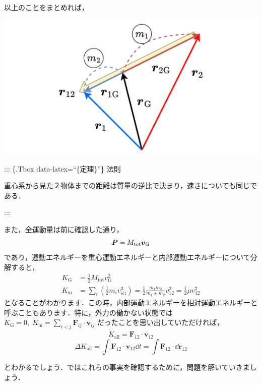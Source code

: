 \documentclass[
  b4paperpaper,
  xelatex,ja=standard]{bxjsbook}
\begin{document}
以上のことをまとめれば，

\includegraphics{source/images/energy/energy2.png}

::: \{.Tbox data-latex=``\{定理\}''\} 法則

重心系から見た２物体までの距離は質量の逆比で決まり，速さについても同じである．

:::

また，全運動量は前に確認した通り，
\[\vb*{P}=M_{\text{tot}}\boldsymbol{v}_{\text{G}} \]
であり，運動エネルギーを重心運動エネルギーと内部運動エネルギーについて分解すると，
\begin{align*}
K_{\text{G}}&=\frac{1}{2}M_{\text{tot}}v_{\text{G}}^2\\
K_{\text{in}}&=\sum_i\left(\frac{1}{2} m_iv_{i\text{G}}^2\right)=\frac{1}{2}\frac{m_1m_2}{m_1+m_2}v_{12}^2=\frac{1}{2}\mu v_{12}^2
\end{align*}
となることがわかります．この時，内部運動エネルギーを相対運動エネルギーと呼ぶこともあります．特に，外力の働かない状態では
\(\dot{K}_{\text{G}}=0,\;\dot{K}_{\text{in}}=\sum_{i<j}\boldsymbol{F}_{ij}\cdot\boldsymbol{v}_{ij}\)
だったことを思い出していただければ，
\[\dot{K}_{\text{all}}=\boldsymbol{F}_{12}\cdot\boldsymbol{v}_{12}\]
\[\Delta K_{\text{all}} = \int \boldsymbol{F}_{12}\cdot\boldsymbol{v}_{12}\dd t = \int \boldsymbol{F}_{12}\cdot\dd{\boldsymbol{r}_{12}}\]

とわかるでしょう．ではこれらの事実を確認するために，問題を解いていきましょう．
\end{document}
